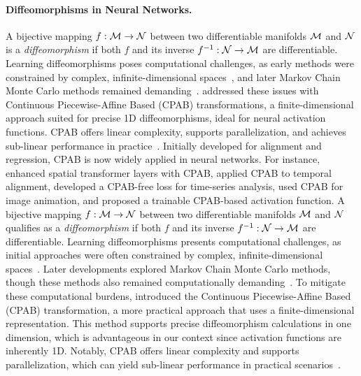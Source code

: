 \paragraph{Diffeomorphisms in Neural Networks.}
A bijective mapping \( f:{\mathcal{M}} \to {\mathcal{N}} \) between two differentiable manifolds \({\mathcal{M}}\) and \({\mathcal{N}}\) is a \emph{diffeomorphism} if both \( f \) and its inverse \( f^{-1}:{\mathcal{N}} \to {\mathcal{M}} \) are differentiable. Learning diffeomorphisms poses computational challenges, as early methods were constrained by complex, infinite-dimensional spaces~\citep{NEURIPS2018_68148596}, and later Markov Chain Monte Carlo methods remained demanding~\citep{allassonniere2010construction, allassonniere2015bayesian, zhang2016bayesian}. \citet{freifeld2015highly, freifeld2017transformations} addressed these issues with Continuous Piecewise-Affine Based (CPAB) transformations, a finite-dimensional approach suited for precise 1D diffeomorphisms, ideal for neural activation functions. CPAB offers linear complexity, supports parallelization, and achieves sub-linear performance in practice~\cite{freifeld2017transformations}. Initially developed for alignment and regression, CPAB is now widely applied in neural networks. For instance, \citet{detlefsen2018deep} enhanced spatial transformer layers with CPAB, \citet{martinez2022closed} applied CPAB to temporal alignment, \citet{weber2023regularization} developed a CPAB-free loss for time-series analysis, \citet{wang2024continuous} used CPAB for image animation, and \citet{Chelly2024DiTAC} proposed a trainable CPAB-based activation function.
\iffalse
A bijective mapping 
$f:{\mathcal{M}} \to {\mathcal{N}}$ between two differentiable manifolds ${\mathcal{M}}$ and ${\mathcal{N}}$ qualifies as a \emph{diffeomorphism} if both 
$f$ and its inverse $f^{-1}:{\mathcal{N}} \to {\mathcal{M}}$ are differentiable. Learning diffeomorphisms presents computational challenges, as initial approaches were often constrained by complex, infinite-dimensional spaces~\citep{NEURIPS2018_68148596}. Later developments explored Markov Chain Monte Carlo methods, though these methods also remained computationally demanding~\citep{allassonniere2010construction, allassonniere2015bayesian, zhang2016bayesian}.
To mitigate these computational burdens, \citet{freifeld2015highly, freifeld2017transformations} introduced the Continuous Piecewise-Affine Based (CPAB) transformation, a more practical approach that uses a finite-dimensional representation. This method supports precise diffeomorphism calculations in one dimension, which is advantageous in our context since activation functions are inherently 1D. Notably, CPAB offers linear complexity and supports parallelization, which can yield sub-linear performance in practical scenarios~\citep{freifeld2017transformations}. 
